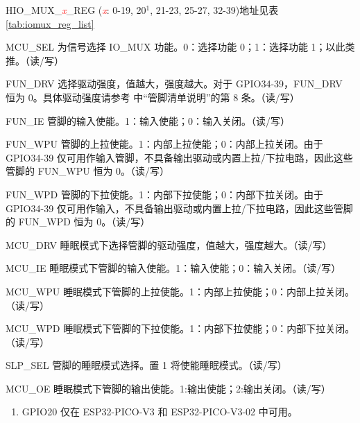 \begin{register}{H}{IO\_MUX\_\textcolor{red}{\it{x}}\_REG (\textcolor{red}{\it{x}}: 0-19, 20$^1$, 21-23, 25-27, 32-39)}{地址见表 \ref{tab:iomux_reg_list}}

\label{regdesc:IOMUXnREG}
%
%
%
%
%
%
%
%
%
%
%
%
\regnewline%
\begin{regdesc}\begin{reglist}
\item [MCU\_SEL]为信号选择 IO\_MUX 功能。0：选择功能 0；1：选择功能 1；以此类推。（读/写）
\label{FUNDRV} \item [FUN\_DRV]选择驱动强度，值越大，强度越大。对于 GPIO34-39，FUN\_DRV 恒为 0。具体驱动强度请参考 \linkchipdatasheetCN 中“管脚清单说明”的第 8 条。（读/写）
\item [FUN\_IE] 管脚的输入使能。1：输入使能；0：输入关闭。（读/写）
\item [FUN\_WPU] \label{regdesc:FUNWPU} 管脚的上拉使能。1：内部上拉使能；0：内部上拉关闭。由于 GPIO34-39 仅可用作输入管脚，不具备输出驱动或内置上拉/下拉电路，因此这些管脚的 FUN\_WPU 恒为 0。（读/写）
\item [FUN\_WPD] \label{regdesc:FUNWPD} 管脚的下拉使能。1：内部下拉使能；0：内部下拉关闭。由于 GPIO34-39 仅可用作输入，不具备输出驱动或内置上拉/下拉电路，因此这些管脚的 FUN\_WPD 恒为 0。（读/写）
\item [MCU\_DRV]睡眠模式下选择管脚的驱动强度，值越大，强度越大。（读/写）
\item [MCU\_IE]睡眠模式下管脚的输入使能。1：输入使能；0：输入关闭。（读/写）
\item [MCU\_WPU]睡眠模式下管脚的上拉使能。1：内部上拉使能；0：内部上拉关闭。（读/写）
\item [MCU\_WPD]睡眠模式下管脚的下拉使能。1：内部下拉使能；0：内部下拉关闭。（读/写）
\item [SLP\_SEL]管脚的睡眠模式选择。置 1 将使能睡眠模式。（读/写）
\item [MCU\_OE]睡眠模式下管脚的输出使能。1:输出使能；2:输出关闭。（读/写）
\end{reglist}\end{regdesc}

\begin{tiplisting}
\vspace{-1em}
\begin{enumerate}
  \vspace{-1em}
  \item GPIO20 仅在 ESP32-PICO-V3 和 ESP32-PICO-V3-02 中可用。
\end{enumerate}
\end{tiplisting}
\end{register}